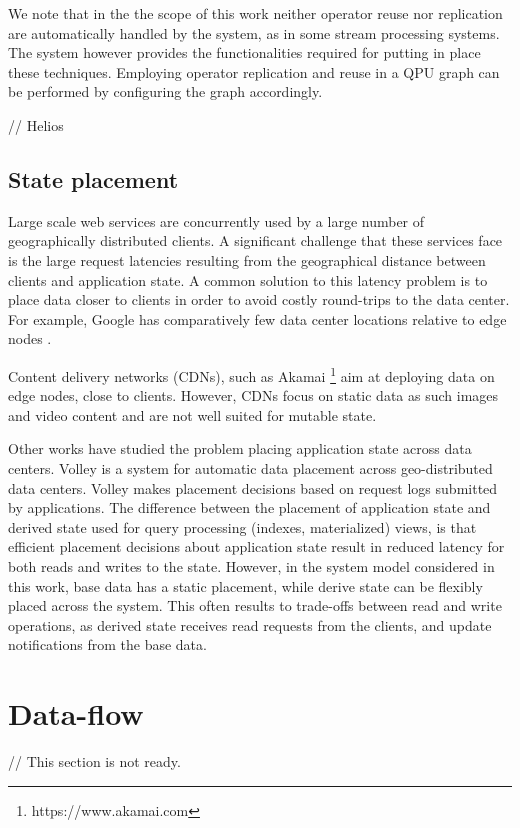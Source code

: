We note that in the the scope of this work neither operator reuse nor replication are automatically handled by the system,
as in some stream processing systems.
The system however provides the functionalities required for putting in place these techniques.
Employing operator replication and reuse in a QPU graph can be performed by configuring the graph accordingly.

\bigskip
\noindent
// Helios \cite{potharaju:helios} 

\subsection{State placement}
Large scale web services are concurrently used by a large number of geographically distributed clients.
A significant challenge that these services face is the large request latencies resulting from the geographical distance
between clients and application state.
A common solution to this latency problem is to place data closer to clients in order to avoid costly round-trips
to the data center.
For example, Google has comparatively few data center locations relative to edge nodes \cite{google:infra}.

Content delivery networks (CDNs), such as Akamai \footnote{https://www.akamai.com} aim at deploying data on edge nodes,
close to clients.
However, CDNs focus on static data as such images and video content and are not well suited for mutable state.

Other works have studied the problem placing application state across data centers.
Volley \cite{agarwal:volley} is a system for automatic data placement across geo-distributed data centers.
Volley makes placement decisions based on request logs submitted by applications.
The difference between the placement of application state and derived state used for query processing (indexes, materialized)
views, is that efficient placement decisions about application state result in reduced latency for both reads and writes
to the state.
However, in the system model considered in this work, base data has a static placement,
while derive state can be flexibly placed across the system.
This often results to trade-offs between read and write operations,
as derived state receives read requests from the clients, and update notifications from the base data.

\section{Data-flow}
// This section is not ready.

